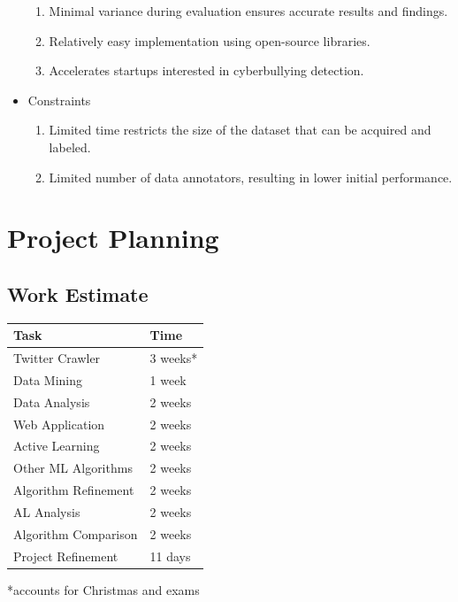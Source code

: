 \documentclass[a4paper,12pt]{article}
\begin{document}
\begin{itemize}
\begin{enumerate}
        \item Minimal variance during evaluation ensures accurate results and findings.
        \item Relatively easy implementation using open-source libraries.
        \item Accelerates startups interested in cyberbullying detection.
    \end{enumerate}
    \item Constraints
    \begin{enumerate}
        \item Limited time restricts the size of the dataset that can be acquired and labeled.
        \item Limited number of data annotators, resulting in lower initial performance.
    \end{enumerate}
    
\end{itemize}
\section{Project Planning}
\subsection{Work Estimate}
 \begin{tabular}{|l l|} 
 \hline
 Task & Time \\ [0.3ex] 
 \hline\hline
 Twitter Crawler & 3 weeks* \\ 
 \hline
 Data Mining & 1 week \\
  \hline
 Data Analysis & 2 weeks \\
 \hline
 Web Application & 2 weeks \\
 \hline
 Active Learning & 2 weeks \\
 \hline
 Other ML Algorithms & 2 weeks \\
 \hline
 Algorithm Refinement & 2 weeks \\
 \hline
 AL Analysis & 2 weeks \\
 \hline
 Algorithm Comparison & 2 weeks \\
 \hline
 Project Refinement & 11 days \\
 \hline
\end{tabular}

*accounts for Christmas and exams
\end{document}
